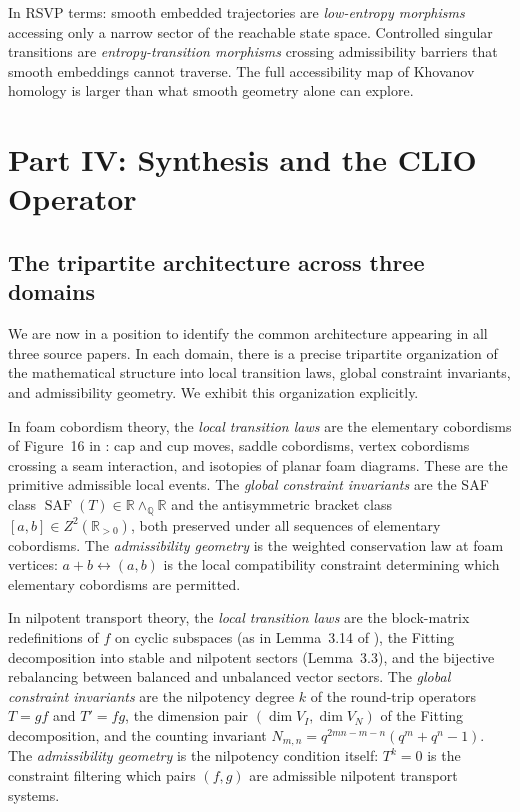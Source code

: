 \documentclass[12pt, a4paper]{article}
\theoremstyle{plain}
\theoremstyle{definition}
\theoremstyle{correspondence}
\DeclareMathOperator{\SAF}{SAF}
\newcommand{\RR}{\mathbb{R}}
\newcommand{\QQ}{\mathbb{Q}}
\newcommand{\wedgeQ}{\wedge_{\QQ}}
\begin{document}
In RSVP terms: smooth embedded trajectories are \emph{low-entropy morphisms} accessing
only a narrow sector of the reachable state space. Controlled singular transitions are
\emph{entropy-transition morphisms} crossing admissibility barriers that smooth
embeddings cannot traverse. The full accessibility map of Khovanov homology is larger
than what smooth geometry alone can explore.

\section{Part IV: Synthesis and the CLIO Operator}

\subsection{The tripartite architecture across three domains}

We are now in a position to identify the common architecture appearing in all three
source papers. In each domain, there is a precise tripartite organization of the
mathematical structure into local transition laws, global constraint invariants, and
admissibility geometry. We exhibit this organization explicitly.

In foam cobordism theory, the \emph{local transition laws} are the elementary cobordisms
of Figure~16 in \cite{IK24foam}: cap and cup moves, saddle cobordisms, vertex
cobordisms crossing a seam interaction, and isotopies of planar foam diagrams. These
are the primitive admissible local events. The \emph{global constraint invariants} are
the SAF class $\SAF(T) \in \RR \wedgeQ \RR$ and the antisymmetric bracket class
$[a,b] \in Z^2(\RR_{>0})$, both preserved under all sequences of elementary cobordisms.
The \emph{admissibility geometry} is the weighted conservation law at foam vertices:
$a + b \leftrightarrow (a,b)$ is the local compatibility constraint determining which
elementary cobordisms are permitted.

In nilpotent transport theory, the \emph{local transition laws} are the block-matrix
redefinitions of $f$ on cyclic subspaces (as in Lemma~3.14 of \cite{CIKLR25}), the
Fitting decomposition into stable and nilpotent sectors (Lemma~3.3), and the bijective
rebalancing between balanced and unbalanced vector sectors. The \emph{global constraint
invariants} are the nilpotency degree $k$ of the round-trip operators $T = gf$ and
$T' = fg$, the dimension pair $(\dim V_I, \dim V_N)$ of the Fitting decomposition, and
the counting invariant $N_{m,n} = q^{2mn-m-n}(q^m + q^n - 1)$. The \emph{admissibility
geometry} is the nilpotency condition itself: $T^k = 0$ is the constraint filtering
which pairs $(f,g)$ are admissible nilpotent transport systems.
\end{document}
